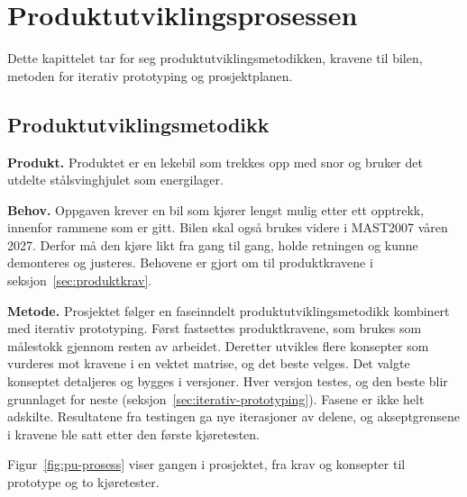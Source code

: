 \section{Produktutviklingsprosessen}
\label{sec:pu-prosess}
Dette kapittelet tar for seg produktutviklingsmetodikken, kravene til bilen, metoden for iterativ prototyping og prosjektplanen.

\subsection{Produktutviklingsmetodikk}
\label{sec:pu-metodikk}
\textbf{Produkt.} Produktet er en lekebil som trekkes opp med snor og bruker det utdelte stålsvinghjulet som energilager.

\textbf{Behov.} Oppgaven krever en bil som kjører lengst mulig etter ett opptrekk, innenfor rammene som er gitt. Bilen skal også brukes videre i MAST2007 våren 2027. Derfor må den kjøre likt fra gang til gang, holde retningen og kunne demonteres og justeres. Behovene er gjort om til produktkravene i seksjon~\ref{sec:produktkrav}.

\textbf{Metode.} Prosjektet følger en faseinndelt produktutviklingsmetodikk kombinert med iterativ prototyping. Først fastsettes produktkravene, som brukes som målestokk gjennom resten av arbeidet. Deretter utvikles flere konsepter som vurderes mot kravene i en vektet matrise, og det beste velges. Det valgte konseptet detaljeres og bygges i versjoner. Hver versjon testes, og den beste blir grunnlaget for neste (seksjon~\ref{sec:iterativ-prototyping}). Fasene er ikke helt adskilte. Resultatene fra testingen ga nye iterasjoner av delene, og akseptgrensene i kravene ble satt etter den første kjøretesten.

Figur~\ref{fig:pu-prosess} viser gangen i prosjektet, fra krav og konsepter til prototype og to kjøretester.

